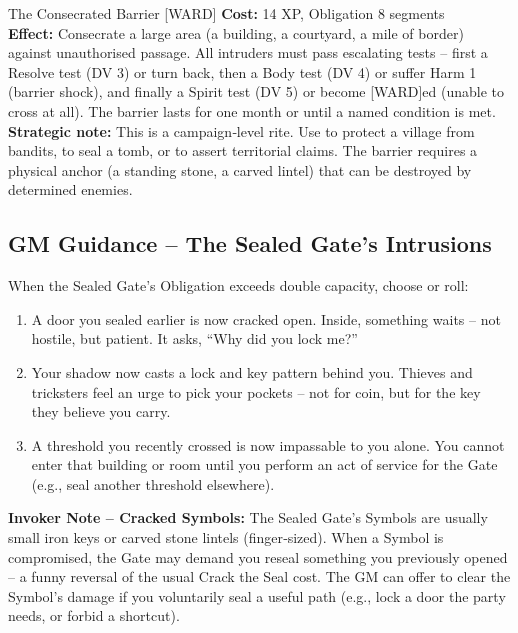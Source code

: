 \documentclass[10pt,a5paper]{book}
\begin{document}
\begin{patronbox}{The Consecrated Barrier [WARD]}
\textbf{Cost:} 14 XP, Obligation 8 segments \\
\textbf{Effect:} Consecrate a large area (a building, a courtyard, a mile of border) against unauthorised passage. All intruders must pass escalating tests – first a Resolve test (DV 3) or turn back, then a Body test (DV 4) or suffer Harm 1 (barrier shock), and finally a Spirit test (DV 5) or become [WARD]ed (unable to cross at all). The barrier lasts for one month or until a named condition is met. \\
\textbf{Strategic note:} This is a campaign‑level rite. Use to protect a village from bandits, to seal a tomb, or to assert territorial claims. The barrier requires a physical anchor (a standing stone, a carved lintel) that can be destroyed by determined enemies.
\end{patronbox}

\subsection*{GM Guidance – The Sealed Gate’s Intrusions}

When the Sealed Gate’s Obligation exceeds double capacity, choose or roll:
\begin{enumerate}
    \item A door you sealed earlier is now cracked open. Inside, something waits – not hostile, but patient. It asks, “Why did you lock me?”
    \item Your shadow now casts a lock and key pattern behind you. Thieves and tricksters feel an urge to pick your pockets – not for coin, but for the key they believe you carry.
    \item A threshold you recently crossed is now impassable to you alone. You cannot enter that building or room until you perform an act of service for the Gate (e.g., seal another threshold elsewhere).
\end{enumerate}

\noindent \textbf{Invoker Note – Cracked Symbols:}
The Sealed Gate’s Symbols are usually small iron keys or carved stone lintels (finger‑sized). When a Symbol is compromised, the Gate may demand you reseal something you previously opened – a funny reversal of the usual Crack the Seal cost. The GM can offer to clear the Symbol’s damage if you voluntarily seal a useful path (e.g., lock a door the party needs, or forbid a shortcut).

\clearpage
\end{document}
